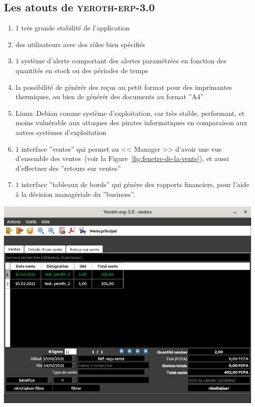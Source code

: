 \documentclass[a4paper, 10pt]{article}
\newcommand{\yeroth}{\textsc{yeroth-erp-3.0}\xspace}
\newcommand{\manager}{<< Manager >>\xspace}
\begin{document}
\begin{multicols}{2}
\section{Les atouts de \yeroth}
\vspace{-0.3em}
\begin{enumerate}[1.]
	\itemsep -0.1em
	\item $1$ tr\`es grande stabilit\'e de l'application
	\item des utilisateurs avec des r\^oles bien sp\'ecifi\'es
	\item $1$ syst\`eme d'alerte comportant des alertes
	      param\'etr\'ees en fonction des quantit\'es en stock
	      ou des p\'eriodes de temps
	\item la possibilit\'e de g\'en\'er\'er des re\c{c}us au
	      petit format pour des imprimantes thermiques, ou bien
	      de g\'en\'er\'er des documents au format ''A4''
	\item Linux--Debian comme syst\`eme d'exploitation, car
	      tr\`es stable, performant, et moins vuln\'erable
	      aux attaques des pirates informatiques en comparaison
	      aux autres syst\`emes d'exploitation
	\item $1$ interface ''ventes'' qui permet au \manager
	      d'avoir une vue d'ensemble des 
	      ventes~(voir la Figure~\ref{fig:fenetre-de-la-vente}),
	      et aussi d'effectuer des ''retours sur ventes''
	\item $1$ interface ''tableaux de bords'' qui
		  g\'en\`ere des rapports financiers,
		  pour l'aide \`a la d\'ecision manag\'eriale
		  du ''business''.
\end{enumerate}

\begin{center}
\includegraphics[scale=0.32]{../images/yeren-fenetre-caisse.png}
\label{fig:fenetre-de-la-vente}
\end{center}



\end{multicols}
\end{document}
